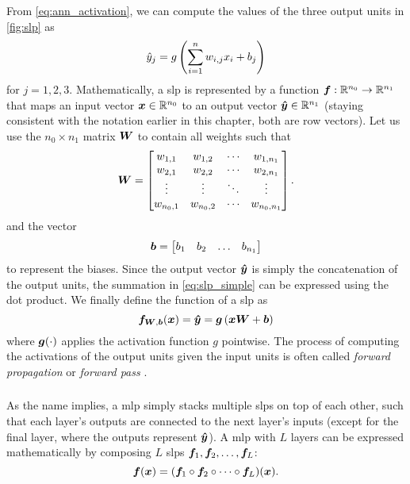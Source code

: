 \documentclass[../report.tex]{subfiles}
\begin{document}
From \cref{eq:ann_activation}, we can compute the values of the three output units in \cref{fig:slp} as
\begin{equation}
    \label{eq:slp_simple}
    \hat{y}_j = g\left(\sum_{i=1}^n{w_{i,j} x_i} + b_j\right)
\end{equation}
for $j=1,2,3$.
Mathematically, a \gls{slp} is represented by a function ${\bm{f}}:\mathbb{R}^{n_0}\to \mathbb{R}^{n_1}$ that maps an input vector ${\bm{x}} \in \mathbb{R}^{n_0}$ to an output vector ${\bm{\hat{y}}} \in \mathbb{R}^{n_1}$ (staying consistent with the notation earlier in this chapter, both are row vectors).
Let us use the $n_0 \times n_1$ matrix ${\bm{W}}$ to contain all weights such that
\begin{equation}
    \label{eq:slp_weights}
    {\bm{W}} = \begin{bmatrix}
        w_{1,1} & w_{1,2} & \cdots & w_{1,n_1} \\ 
        w_{2,1} & w_{2,2} & \cdots & w_{2,n_1} \\ 
        \vdots & \vdots & \ddots & \vdots \\ 
        w_{n_0,1} & w_{n_0,2} & \cdots & w_{n_0,n_1} \\ 
    \end{bmatrix}.
\end{equation}
and the vector
\begin{equation}
    \label{eq:slp_biases}
    {\bm{b}} = \begin{bmatrix}
        b_1 & b_2 & \dots & b_{n_1}
    \end{bmatrix}
\end{equation}
to represent the biases.
Since the output vector ${\bm{\hat{y}}}$ is simply the concatenation of the output units, the summation in \cref{eq:slp_simple} can be expressed using the dot product. We finally define the function of a \gls{slp} as
\begin{equation}
    \label{eq:slp}
    {\bm{f}}_{{\bm{W}},{\bm{b}}}({\bm{x}}) = {\bm{\hat{y}}} = {\bm{g}}\left(
        {\bm{x}} {\bm{W}} + {\bm{b}}
    \right)
\end{equation}
where ${\bm{g}}(\cdot)$ applies the activation function $g$ pointwise.
The process of computing the activations of the output units given the input units is often called \emph{forward propagation} or \emph{forward pass} \cite{burkov2019}.

\subsubsection{}
As the name implies, a \gls{mlp} simply stacks multiple \glspl{slp} on top of each other, such that each layer's outputs are connected to the next layer's inputs (except for the final layer, where the outputs represent ${\bm{\hat{y}}}$).
A \gls{mlp} with $L$ layers can be expressed mathematically by composing $L$ \glspl{slp} ${\bm{f}}_1,{\bm{f}}_2,\dots,{\bm{f}}_L$:
\begin{equation}
    \label{eq:mlp}
    {\bm{f}}({\bm{x}}) = ({\bm{f}}_1 \circ {\bm{f}}_2 \circ \dots \circ {\bm{f}}_L)({\bm{x}}).
\end{equation}
\end{document}
